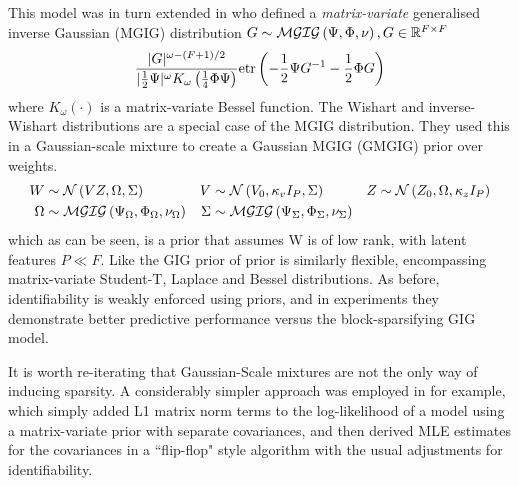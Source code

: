 This model was in turn extended in \cite{Yang2011} who defined a \emph{matrix-variate} generalised inverse Gaussian (MGIG) distribution $G\sim \mathcal{MGIG}\left(\Psi, \Phi, \nu\right), G \in { \mathbb{R}^{F \times F} }$
\begin{align}
\frac{|G|^{\omega - (F + 1)/2}}{|\frac{1}{2} \Psi|^\omega K_\omega \left(\frac{1}{4}\Phi \Psi\right)} \text{etr}\left( -\frac{1}{2} \Psi {G}^{-1} - \frac{1}{2} \Phi G \right)
\end{align}
where $K_\omega(\cdot)$ is a matrix-variate Bessel function. The Wishart and inverse-Wishart distributions are a special case of the MGIG distribution. They used this in a Gaussian-scale mixture to create a Gaussian MGIG (GMGIG) prior over weights.
\begin{align}
W & \sim \mathcal{N} \left(VZ, \Omega, \Sigma\right) &
V & \sim \mathcal{N} \left(V_0, \kappa_v I_P, \Sigma\right) &
Z & \sim \mathcal{N} \left(Z_0, \Omega, \kappa_z I_P\right) \\
\Omega & \sim \mathcal{MGIG}\left( \Psi_\Omega, \Phi_\Omega, \nu_\Omega \right) &
\Sigma & \sim \mathcal{MGIG}\left( \Psi_\Sigma, \Phi_\Sigma, \nu_\Sigma \right) &
\end{align}
which as can be seen, is a prior that assumes W is of low rank, with latent features $P \ll F$. Like the GIG prior of \cite{Archambeau2011} prior is similarly flexible, encompassing matrix-variate Student-T, Laplace and Bessel distributions. As before, identifiability is weakly enforced using priors, and in experiments they demonstrate better predictive performance versus the block-sparsifying GIG model.

It is worth re-iterating that Gaussian-Scale mixtures are not the only way of inducing sparsity. A considerably simpler approach was employed in \cite{Zhang2010a} for example, which simply added L1 matrix norm terms to the log-likelihood of a model using a matrix-variate prior with separate covariances, and then derived MLE estimates for the covariances in a ``flip-flop" style algorithm with the usual adjustments for identifiability. 




